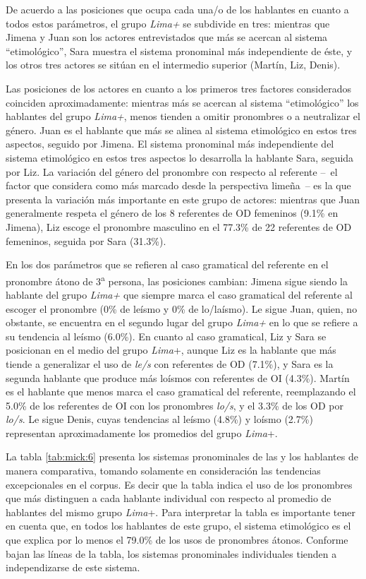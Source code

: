 \documentclass[output=paper]{../langscibook}
\begin{document}
De acuerdo a las posiciones que ocupa cada una/o de los hablantes en cuanto a todos estos parámetros, el grupo \textit{Lima+} se subdivide en tres: mientras que Jimena y Juan son los actores entrevistados que más se acercan al sistema “etimológico”, Sara muestra el sistema pronominal más independiente de éste, y los otros tres actores se sitúan en el intermedio superior (Martín, Liz, Denis).

Las posiciones de los actores en cuanto a los primeros tres factores considerados coinciden aproximadamente: mientras más se acercan al sistema “etimológico” los hablantes del grupo \textit{Lima+}, menos tienden a omitir pronombres o a neutralizar el género. Juan es el hablante que más se alinea al sistema etimológico en estos tres aspectos, seguido por Jimena. El sistema pronominal más independiente del sistema etimológico en estos tres aspectos lo desarrolla la hablante Sara, seguida por Liz. La variación del género del pronombre con respecto al referente -- el factor que \citet{Caravedo2014} considera como más marcado desde la perspectiva limeña -- es la que presenta la variación más importante en este grupo de actores: mientras que Juan generalmente respeta el género de los 8 referentes de OD femeninos (9.1\% en Jimena), Liz escoge el pronombre masculino en el 77.3\% de 22 referentes de OD femeninos, seguida por Sara (31.3\%). 

En los dos parámetros que se refieren al caso gramatical del referente en el pronombre átono de 3\textsuperscript{a} persona, las posiciones cambian: Jimena sigue siendo la hablante del grupo \textit{Lima+} que siempre marca el caso gramatical del referente al escoger el pronombre (0\% de leísmo y 0\% de lo/laísmo). Le sigue Juan, quien, no obstante, se encuentra en el segundo lugar del grupo \textit{Lima+} en lo que se refiere a su tendencia al leísmo (6.0\%). En cuanto al caso gramatical, Liz y Sara se posicionan en el medio del grupo \textit{Lima}+, aunque Liz es la hablante que más tiende a generalizar el uso de \textit{le/s} con referentes de OD (7.1\%), y Sara es la segunda hablante que produce más loísmos con referentes de OI (4.3\%). Martín es el hablante que menos marca el caso gramatical del referente, reemplazando el 5.0\% de los referentes de OI con los pronombres \textit{lo/s}, y el 3.3\% de los OD por \textit{lo/s}. Le sigue Denis, cuyas tendencias al leísmo (4.8\%) y loísmo (2.7\%) representan aproximadamente los promedios del grupo \textit{Lima}+. 

La tabla \ref{tab:mick:6} presenta los sistemas pronominales de las y los hablantes de manera comparativa, tomando solamente en consideración las tendencias excepcionales en el corpus. Es decir que la tabla indica el uso de los pronombres que más distinguen a cada hablante individual con respecto al promedio de hablantes del mismo grupo \textit{Lima}+. Para interpretar la tabla es importante tener en cuenta que, en todos los hablantes de este grupo, el sistema etimológico es el que explica por lo menos el 79.0\% de los usos de pronombres átonos. Conforme bajan las líneas de la tabla, los sistemas pronominales individuales tienden a independizarse de este sistema.
\end{document}
